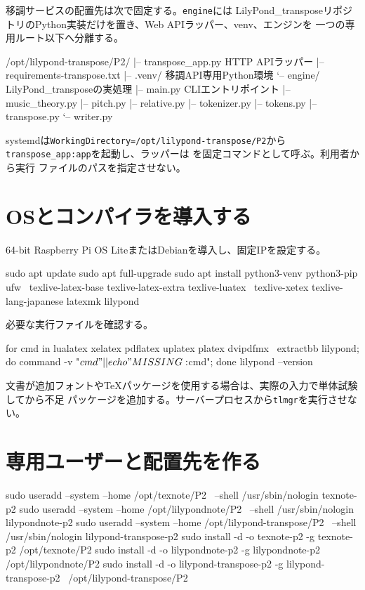 \documentclass[uplatex,a4paper,11pt]{jsarticle}
\begin{document}
移調サービスの配置先は次で固定する。\texttt{engine}には
LilyPond\_transposeリポジトリのPython実装だけを置き、Web APIラッパー、venv、エンジンを
一つの専用ルート以下へ分離する。

\begin{command}
/opt/lilypond-transpose/P2/
|-- transpose_app.py          HTTP APIラッパー
|-- requirements-transpose.txt
|-- .venv/                    移調API専用Python環境
`-- engine/                   LilyPond_transposeの実処理
    |-- main.py               CLIエントリポイント
    |-- music_theory.py
    |-- pitch.py
    |-- relative.py
    |-- tokenizer.py
    |-- tokens.py
    |-- transpose.py
    `-- writer.py
\end{command}

systemdは\texttt{WorkingDirectory=/opt/lilypond-transpose/P2}から
\texttt{transpose\_app:app}を起動し、ラッパーは
を固定コマンドとして呼ぶ。利用者から実行
ファイルのパスを指定させない。

\section{OSとコンパイラを導入する}

64-bit Raspberry Pi OS LiteまたはDebianを導入し、固定IPを設定する。

\begin{command}
sudo apt update
sudo apt full-upgrade
sudo apt install python3-venv python3-pip ufw \
  texlive-latex-base texlive-latex-extra texlive-luatex \
  texlive-xetex texlive-lang-japanese latexmk lilypond
\end{command}

必要な実行ファイルを確認する。

\begin{command}
for cmd in lualatex xelatex pdflatex uplatex platex dvipdfmx \
  extractbb lilypond; do command -v "$cmd" || echo "MISSING: $cmd"; done
lilypond --version
\end{command}

文書が追加フォントやTeXパッケージを使用する場合は、実際の入力で単体試験してから不足
パッケージを追加する。サーバープロセスから\texttt{tlmgr}を実行させない。

\section{専用ユーザーと配置先を作る}

\begin{command}
sudo useradd --system --home /opt/texnote/P2 \
  --shell /usr/sbin/nologin texnote-p2
sudo useradd --system --home /opt/lilypondnote/P2 \
  --shell /usr/sbin/nologin lilypondnote-p2
sudo useradd --system --home /opt/lilypond-transpose/P2 \
  --shell /usr/sbin/nologin lilypond-transpose-p2
sudo install -d -o texnote-p2 -g texnote-p2 /opt/texnote/P2
sudo install -d -o lilypondnote-p2 -g lilypondnote-p2 /opt/lilypondnote/P2
sudo install -d -o lilypond-transpose-p2 -g lilypond-transpose-p2 \
  /opt/lilypond-transpose/P2
\end{command}
\end{document}
